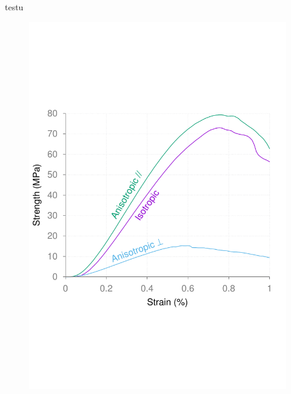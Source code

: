 \documentclass{article}
\begin{document}
	testu
	\begin{figure}[ht]
		\centering
		\includegraphics[width=\linewidth]{figures/sup_fig1.pdf}
	\end{figure}
\end{document}
